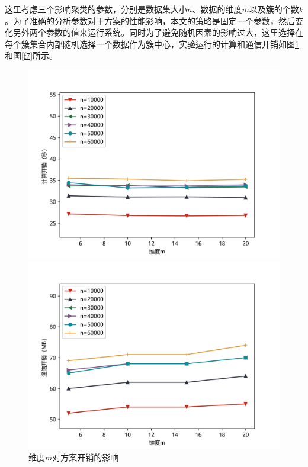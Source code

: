 这里考虑三个影响聚类的参数，分别是数据集大小$ n $、数据的维度$ m $以及簇的个数$ k $。为了准确的分析参数对于方案的性能影响，本文的策略是固定一个参数，然后变化另外两个参数的值来运行系统。同时为了避免随机因素的影响过大，这里选择在每个簇集合内部随机选择一个数据作为簇中心，实验运行的计算和通信开销如图\ref{f6}和图\ref{f7}所示。

\begin{figure}[htbp] %
	\begin{minipage}[t]{0.5\linewidth}
		\includegraphics[width=\linewidth]{img/newm_time.png}
		
	\end{minipage}%
	\hfill%
	\begin{minipage}[t]{0.5\linewidth}
		\includegraphics[width=\linewidth]{img/newm_comm.png}
		
	\end{minipage}
	\caption{维度$ m $对方案开销的影响}
	\label{f6}
\end{figure}

